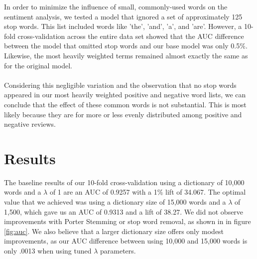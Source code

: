 \documentclass{article}
\begin{document}
In order to minimize the influence of small, commonly-used words on the sentiment analysis, we tested a model that ignored a set of approximately 125 stop words. This list included words like 'the', 'and', 'a', and 'are'. However, a 10-fold cross-validation across the entire data set showed that the AUC difference between the model that omitted stop words and our base model was only 0.5\%. Likewise, the most heavily weighted terms remained almost exactly the same as for the original model.
\\\\Considering this negligible variation and the observation that no stop words appeared in our most heavily weighted positive and negative word lists, we can conclude that the effect of these common words is not substantial. This is most likely because they are for more or less evenly distributed among positive and negative reviews.


\section{Results}
The baseline results of our 10-fold cross-validation using a dictionary of 10,000 words and a $\lambda$ of 1 are an AUC of 0.9257 with a 1\% lift of 34.067. The optimal value that we achieved was using a dictionary size of 15,000 words and a $\lambda$ of 1,500, which gave us an AUC of 0.9313 and a lift of 38.27. We did not observe improvements with Porter Stemming or stop word removal, as shown in in figure \ref{fig:auc}. We also believe that a larger dictionary size offers only modest improvements, as our AUC difference between using 10,000 and 15,000 words is only .0013 when using tuned $\lambda$ parameters.
\end{document}
